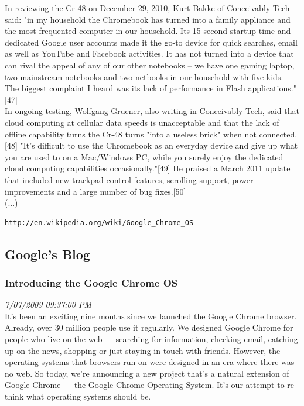 \documentclass{article}
\begin{document}
			In reviewing the Cr-48 on December 29, 2010, Kurt Bakke of Conceivably Tech said: "in my household the Chromebook has turned into a family appliance and the most frequented computer in our household. Its 15 second startup time and dedicated Google user accounts made it the go-to device for quick searches, email as well as YouTube and Facebook activities. It has not turned into a device that can rival the appeal of any of our other notebooks – we have one gaming laptop, two mainstream notebooks and two netbooks in our household with five kids. The biggest complaint I heard was its lack of performance in Flash applications."[47]\\
			In ongoing testing, Wolfgang Gruener, also writing in Conceivably Tech, said that cloud computing at cellular data speeds is unacceptable and that the lack of offline capability turns the Cr-48 turns "into a useless brick" when not connected.[48] "It's difficult to use the Chromebook as an everyday device and give up what you are used to on a Mac/Windows PC, while you surely enjoy the dedicated cloud computing capabilities occasionally."[49] He praised a March 2011 update that included new trackpad control features, scrolling support, power improvements and a large number of bug fixes.[50]\\(...)
	\begin{verbatim}http://en.wikipedia.org/wiki/Google_Chrome_OS\end{verbatim}

	\subsection{Google's Blog}
	\subsubsection{Introducing the Google Chrome OS}
	\textit{7/07/2009 09:37:00 PM}\\
	It's been an exciting nine months since we launched the Google Chrome browser. Already, over 30 million people use it regularly. We designed Google Chrome for people who live on the web — searching for information, checking email, catching up on the news, shopping or just staying in touch with friends. However, the operating systems that browsers run on were designed in an era where there was no web. So today, we're announcing a new project that's a natural extension of Google Chrome — the Google Chrome Operating System. It's our attempt to re-think what operating systems should be.\\ 
\end{document}
